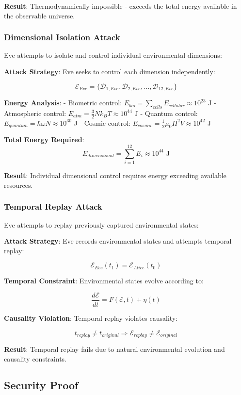 \documentclass[12pt]{article}
\begin{document}
\textbf{Result}: Thermodynamically impossible - exceeds the total energy available in the observable universe.

\subsubsection{Dimensional Isolation Attack}

Eve attempts to isolate and control individual environmental dimensions:

\textbf{Attack Strategy}: Eve seeks to control each dimension independently:

$$\mathcal{E}_{Eve} = \{\mathcal{D}_{1,Eve}, \mathcal{D}_{2,Eve}, \ldots, \mathcal{D}_{12,Eve}\}$$

\textbf{Energy Analysis}:
- Biometric control: $E_{bio} = \sum_{cells} E_{cellular} \approx 10^{23}$ J
- Atmospheric control: $E_{atm} = \frac{3}{2}Nk_B T \approx 10^{44}$ J
- Quantum control: $E_{quantum} = \hbar \omega N \approx 10^{30}$ J
- Cosmic control: $E_{cosmic} = \frac{1}{2}\mu_0 H^2 V \approx 10^{42}$ J

\textbf{Total Energy Required}:
$$E_{dimensional} = \sum_{i=1}^{12} E_i \approx 10^{44} \text{ J}$$

\textbf{Result}: Individual dimensional control requires energy exceeding available resources.

\subsubsection{Temporal Replay Attack}

Eve attempts to replay previously captured environmental states:

\textbf{Attack Strategy}: Eve records environmental states and attempts temporal replay:

$$\mathcal{E}_{Eve}(t_1) = \mathcal{E}_{Alice}(t_0)$$

\textbf{Temporal Constraint}: Environmental states evolve according to:

$$\frac{d\mathcal{E}}{dt} = F(\mathcal{E}, t) + \eta(t)$$

\textbf{Causality Violation}: Temporal replay violates causality:

$$t_{replay} \neq t_{original} \Rightarrow \mathcal{E}_{replay} \neq \mathcal{E}_{original}$$

\textbf{Result}: Temporal replay fails due to natural environmental evolution and causality constraints.

\subsection{Security Proof}
\end{document}
